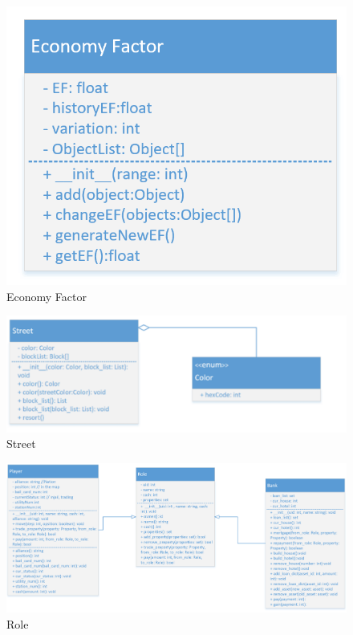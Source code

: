 \documentclass[a4paper,11pt]{article}
\begin{document}
\begin{figure}[H]
\includegraphics[scale=0.22]{image/ef.png}
\caption{Economy Factor}
\end{figure}
\begin{figure}[H]
\includegraphics[scale=0.7]{image/street.png}
\caption{Street}
\end{figure}
\begin{figure}[H]
\includegraphics[scale=0.22]{image/role.png}
\caption{Role}
\end{figure}
\end{document}

